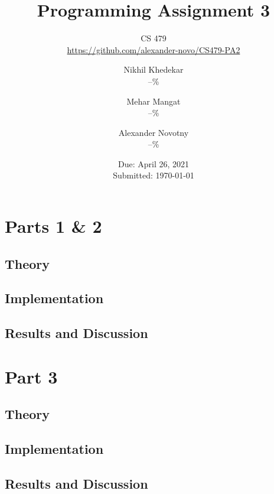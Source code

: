 \documentclass[headings=optiontoheadandtoc,listof=totoc,parskip=full]{scrartcl}
\title{Programming Assignment 3}
\subtitle{CS 479\\\url{https://github.com/alexander-novo/CS479-PA2}}
\author{Nikhil Khedekar\\--\% \and Mehar Mangat\\--\% \and Alexander Novotny\\--\%}
\date{Due: April 26, 2021 \\ Submitted: \today}
\begin{document}
\maketitle
\tableofcontents
{}

\newpage
{}

\section{Parts 1 \& 2}
\label{sec:part-1}

\subsection{Theory}


\subsection{Implementation}
\label{sec:part-1-impl}


\subsection{Results and Discussion}



\section{Part 3}
\label{sec:part-3}

\subsection{Theory}
\label{sec:part-3-theory}


\subsection{Implementation}
\label{sec:part-3-impl}


\subsection{Results and Discussion}
\end{document}
